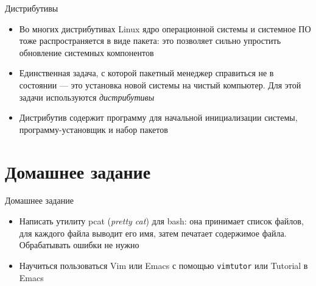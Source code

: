 \documentclass{beamer}
\begin{document}
\begin{frame}{Дистрибутивы}
	\begin{itemize}
		\item{Во многих дистрибутивах Linux ядро операционной системы и системное ПО тоже распространяется в виде пакета: это позволяет сильно упростить обновление системных компонентов}\pause
		\item{Единственная задача, с которой пакетный менеджер справиться не в состоянии --- это установка новой системы на чистый компьютер. Для этой задачи используются \emph{дистрибутивы}}\pause
		\item{Дистрибутив содержит программу для начальной инициализации системы, программу-установщик и набор пакетов}
	\end{itemize}
\end{frame}

\section{Домашнее задание}

\begin{frame}{Домашнее задание}
	\begin{itemize}
		\item{Написать утилиту pcat (\emph{pretty cat}) для bash: она принимает список файлов, для каждого файла выводит его имя, затем печатает содержимое файла. Обрабатывать ошибки не нужно}
		\item{Научиться пользоваться Vim или Emacs с помощью \texttt{vimtutor} или Tutorial в Emacs}
	\end{itemize}	
\end{frame}
\end{document}
